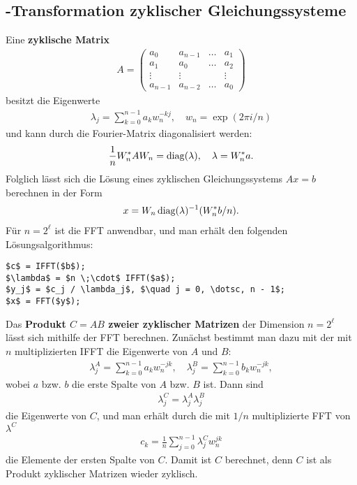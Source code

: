 \pagebreak

\subsection{%
    -Transformation zyklischer Gleichungssysteme%
}

Eine \textbf{zyklische Matrix}
\begin{align*}
    A =
    \begin{pmatrix}
        a_0 & a_{n-1} & \dots & a_1 \\
        a_1 & a_0 & \dots & a_2 \\
        \vdots & \vdots & & \vdots \\
        a_{n-1} & a_{n-2} & \dots & a_0
    \end{pmatrix}
\end{align*}
besitzt die Eigenwerte
\begin{align*}
    \lambda_j = \sum_{k=0}^{n-1} a_k w_n^{-kj}, \quad
    w_n = \exp(2 \pi i / n)
\end{align*}
und kann durch die Fourier-Matrix diagonalisiert werden:
\begin{align*}
    \frac{1}{n} W_n^\ast A W_n = \operatorname{diag}(\lambda), \quad
    \lambda = W_n^\ast a.
\end{align*}
Folglich lässt sich die Lösung eines zyklischen Gleichungssystems $Ax = b$
berechnen in der Form
\begin{align*}
    x = W_n \operatorname{diag}(\lambda)^{-1} (W_n^\ast b / n).
\end{align*}
Für $n = 2^\ell$ ist die FFT anwendbar, und man erhält den folgenden
Lösungsalgorithmus:
\begin{lstlisting}[mathescape]
$c$ = IFFT($b$);
$\lambda$ = $n \;\cdot$ IFFT($a$);
$y_j$ = $c_j / \lambda_j$, $\quad j = 0, \dotsc, n - 1$;
$x$ = FFT($y$);
\end{lstlisting}

\linie

Das \textbf{Produkt $C = AB$ zweier zyklischer Matrizen} der Dimension
$n = 2^\ell$ lässt sich mithilfe der FFT berechnen.
Zunächst bestimmt man dazu mit der mit $n$ multiplizierten IFFT die
Eigenwerte von $A$ und $B$:
\begin{align*}
    \lambda_j^A = \sum_{k=0}^{n-1} a_k w_n^{-jk}, \quad
    \lambda_j^B = \sum_{k=0}^{n-1} b_k w_n^{-jk},
\end{align*}
wobei $a$ bzw. $b$ die erste Spalte von $A$ bzw. $B$ ist.
Dann sind
\begin{align*}
    \lambda_j^C = \lambda_j^A \lambda_j^B
\end{align*}
die Eigenwerte von $C$, und man erhält durch die mit $1/n$ multiplizierte FFT
von $\lambda^C$
\begin{align*}
    c_k = \frac{1}{n} \sum_{j=0}^{n-1} \lambda_j^C w_n^{jk}
\end{align*}
die Elemente der ersten Spalte von $C$.
Damit ist $C$ berechnet, denn $C$ ist als Produkt zyklischer Matrizen
wieder zyklisch.

